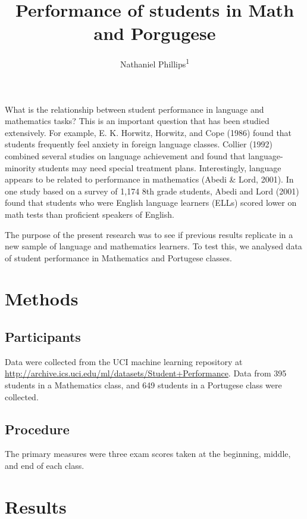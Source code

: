 \documentclass[english,floatsintext,man]{apa6}
\title{Performance of students in Math and Porgugese}
\author{Nathaniel Phillips\textsuperscript{1}}
\affiliation{
    \vspace{0.5cm}
          \textsuperscript{1} University of Basel  }
\theoremstyle{definition}
\theoremstyle{definition}
\theoremstyle{definition}
\theoremstyle{remark}
\begin{document}
\maketitle

\setcounter{secnumdepth}{0}



What is the relationship between student performance in language and
mathematics tasks? This is an important question that has been studied
extensively. For example, E. K. Horwitz, Horwitz, and Cope (1986) found
that students frequently feel anxiety in foreign language classes.
Collier (1992) combined several studies on language achievement and
found that language-minority students may need special treatment plans.
Interestingly, language appears to be related to performance in
mathematics (Abedi \& Lord, 2001). In one study based on a survey of
1,174 8th grade students, Abedi and Lord (2001) found that students who
were English language learners (ELLs) scored lower on math tests than
proficient speakers of English.

The purpose of the present research was to see if previous results
replicate in a new sample of language and mathematics learners. To test
this, we analysed data of student performance in Mathematics and
Portugese classes.

\section{Methods}\label{methods}

\subsection{Participants}\label{participants}

Data were collected from the UCI machine learning repository at
\url{http://archive.ics.uci.edu/ml/datasets/Student+Performance}. Data
from 395 students in a Mathematics class, and 649 students in a
Portugese class were collected.

\subsection{Procedure}\label{procedure}

The primary measures were three exam scores taken at the beginning,
middle, and end of each class.

\section{Results}\label{results}
\end{document}
